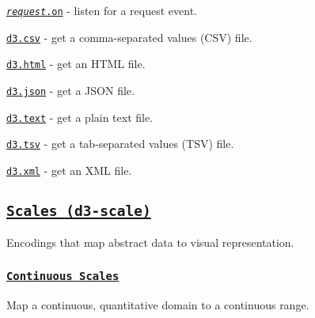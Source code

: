 \begin{DoxyItemize}
\item \href{https://github.com/d3/d3-request/blob/master/README.md#request_on}{\tt {\itshape request}.on} -\/ listen for a request event.
\item \href{https://github.com/d3/d3-request/blob/master/README.md#csv}{\tt d3.\+csv} -\/ get a comma-\/separated values (C\+SV) file.
\item \href{https://github.com/d3/d3-request/blob/master/README.md#html}{\tt d3.\+html} -\/ get an H\+T\+ML file.
\item \href{https://github.com/d3/d3-request/blob/master/README.md#json}{\tt d3.\+json} -\/ get a J\+S\+ON file.
\item \href{https://github.com/d3/d3-request/blob/master/README.md#text}{\tt d3.\+text} -\/ get a plain text file.
\item \href{https://github.com/d3/d3-request/blob/master/README.md#tsv}{\tt d3.\+tsv} -\/ get a tab-\/separated values (T\+SV) file.
\item \href{https://github.com/d3/d3-request/blob/master/README.md#xml}{\tt d3.\+xml} -\/ get an X\+ML file.
\end{DoxyItemize}

\subsection*{\href{https://github.com/d3/d3-scale}{\tt Scales (d3-\/scale)}}

Encodings that map abstract data to visual representation.

\subsubsection*{\href{https://github.com/d3/d3-scale/blob/master/README.md#continuous-scales}{\tt Continuous Scales}}

Map a continuous, quantitative domain to a continuous range.


